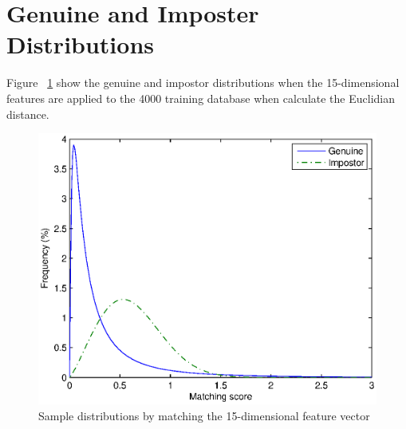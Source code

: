 \section{Genuine and Imposter Distributions}
\label{sec:experiment:distribution}

Figure ~\ref{fig:experiment:11p} show the genuine and impostor distributions when the 15-dimensional features are applied to the 4000 training database when calculate the Euclidian distance.

\begin{figure}[htb]
  \begin{center}
    \includegraphics[scale=1]{ch-experiment/figures/11p.eps}
    \caption{Sample distributions by matching the 15-dimensional feature vector}
    \label{fig:experiment:11p}
  \end{center}
\end{figure}

